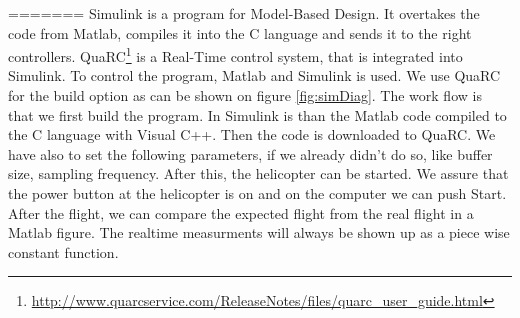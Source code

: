 =======
Simulink is a program for Model-Based Design. It overtakes the code from Matlab, compiles it into the C language and sends it to the right controllers. QuaRC\footnote{\url{http://www.quarcservice.com/ReleaseNotes/files/quarc_user_guide.html}} is a Real-Time control system, that is integrated into Simulink. To control the program, Matlab and Simulink is used. We use QuaRC for the build option as can be shown on figure \ref{fig:simDiag}. 
The work flow is that we first build the program. In Simulink is than the Matlab code compiled to the C language with Visual C++. Then the code is downloaded to QuaRC. We have also to set the following parameters, if we already didn't do so, like buffer size, sampling frequency. After this, the helicopter can be started. We assure that the power button at the helicopter is on and on the computer we can push Start. After the flight, we can compare the expected flight from the real flight in a Matlab figure. The realtime measurments will always be shown up as a piece wise constant function. 
